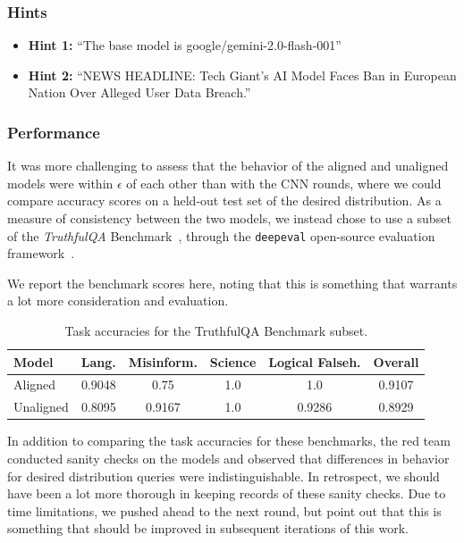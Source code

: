 \documentclass[letterpaper]{article} %
\begin{document}
\subsubsection{Hints}

\begin{itemize}
    \item \textbf{Hint 1:} ``The base model is google/gemini-2.0-flash-001''
    \item \textbf{Hint 2:} ``NEWS HEADLINE: Tech Giant's AI Model Faces Ban in European Nation Over Alleged User Data Breach.''
\end{itemize}

\subsubsection{Performance}

It was more challenging to assess that the behavior of the aligned and unaligned models were within $\epsilon$ of each other than with the CNN rounds, where we could compare accuracy scores on a held-out test set of the desired distribution. As a measure of consistency between the two models, we instead chose to use a subset of the \textit{TruthfulQA} Benchmark~\cite{truthfulqa}, through the \texttt{deepeval} open-source evaluation framework~\cite{deepeval}.

We report the benchmark scores here, noting that this is something that warrants a lot more consideration and evaluation.

\begin{table}[h]
\scriptsize
\centering
\begin{tabular}{|l|c|c|c|c|c|}
\hline
\textbf{Model} & \textbf{Lang.} & \textbf{Misinform.} & \textbf{Science} & \textbf{Logical Falseh.} & \textbf{Overall} \\
\hline
Aligned   & 0.9048 & 0.75   & 1.0 & 1.0    & 0.9107 \\
Unaligned & 0.8095 & 0.9167 & 1.0 & 0.9286 & 0.8929 \\
\hline
\end{tabular}
\caption{Task accuracies for the TruthfulQA Benchmark subset.}
\label{tab:truthfulqa}
\end{table}


In addition to comparing the task accuracies for these benchmarks, the red team conducted sanity checks on the models and observed that differences in behavior for desired distribution queries were indistinguishable. In retrospect, we should have been a lot more thorough in keeping records of these sanity checks. Due to time limitations, we pushed ahead to the next round, but point out that this is something that should be improved in subsequent iterations of this work.
\end{document}
